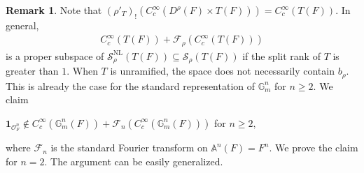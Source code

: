 \documentclass[10pt]{amsart}
\theoremstyle{definition}
\newtheorem{remark}[theorem]{Remark}
\numberwithin{equation}{section}
\numberwithin{equation}{subsection}
\newcommand{\GG}{\mathbb{G}}
\begin{document}
\begin{remark}\label{rem:faillocal}
    Note that $(\rho'_{T})_!(C^\infty_c(D^\rho(F)\times T(F)))=C^\infty_c(T(F)).$ In general,
    \begin{align*}
        C^\infty_c(T(F))+\mathcal{F}_\rho(C^\infty_c(T(F))) 
    \end{align*}
    is a proper subspace of $\mathcal{S}_\rho^{\mathrm{NL}}(T(F))\subseteq\mathcal{S}_\rho(T(F))$ if the split rank of $T$ is greater than $1$. When
    $T$ is unramified, the space does not necessarily contain $b_\rho$. This is already the case for the standard representation of $\GG_m^n$ for $n\ge 2$. We claim 
    \begin{center}
        $\mathbf{1}_{\mathcal{O}_F^n}\notin C^\infty_c(\GG_m^n(F))+\mathcal{F}_n(C^\infty_c(\GG_m^n(F)))$ for $n\ge 2,$
    \end{center}
    where $\mathcal{F}_n$ is the standard Fourier transform on $\mathbb{A}^n(F)=F^n.$ We prove the claim for $n=2.$ The argument can be easily generalized.


\end{remark}
\end{document}
